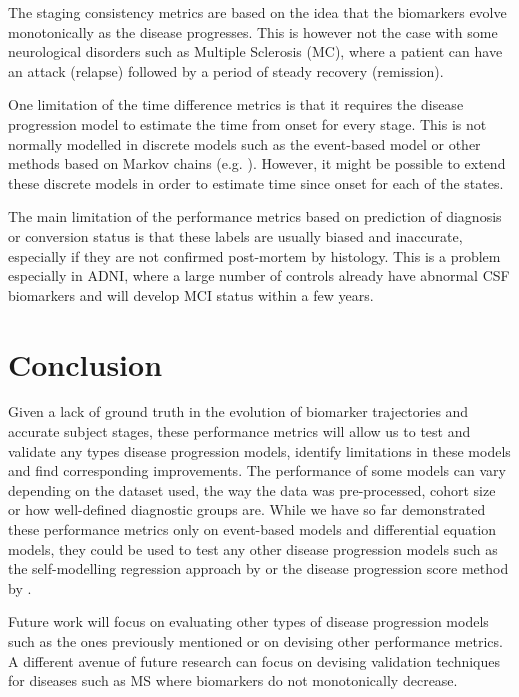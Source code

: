 The staging consistency metrics are based on the idea that the biomarkers evolve monotonically as the disease progresses. This is however not the case with some neurological disorders such as Multiple Sclerosis (MC), where a patient can have an attack (relapse) followed by a period of steady recovery (remission). 

One limitation of the time difference metrics is that it requires the disease progression model to estimate the time from onset for every stage. This is not normally modelled in discrete models such as the event-based model or other methods based on Markov chains (e.g. \cite{sukkar2012disease}). However, it might be possible to extend these discrete models in order to estimate time since onset for each of the states.

The main limitation of the performance metrics based on prediction of diagnosis or conversion status is that these labels are usually biased and inaccurate, especially if they are not confirmed post-mortem by histology. This is a problem especially in ADNI, where a large number of controls already have abnormal CSF biomarkers and will develop MCI status within a few years. 

\section{Conclusion}
\label{sec:perfConclusion}

Given a lack of ground truth in the evolution of biomarker trajectories and accurate subject stages, these performance metrics will allow us to test and validate any types disease progression models, identify limitations in these models and find corresponding improvements. The performance of some models can vary depending on the dataset used, the way the data was pre-processed, cohort size or how well-defined diagnostic groups are. While we have so far demonstrated these performance metrics only on event-based models and differential equation models, they could be used to test any other disease progression models such as the self-modelling regression approach by \cite{donohue2014estimating} or the disease progression score method by \cite{jedynak2012computational}.

Future work will focus on evaluating other types of disease progression models such as the ones previously mentioned or on devising other performance metrics. A different avenue of future research can focus on devising validation techniques for diseases such as MS where biomarkers do not monotonically decrease. 

